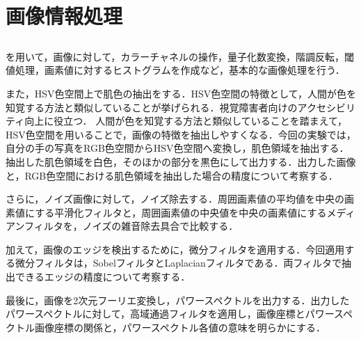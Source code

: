 \chapter{画像情報処理}
\section{\purpose}
\matlab を用いて，画像に対して，カラーチャネルの操作，量子化数変換，階調反転，閾値処理，画素値に対するヒストグラムを作成など，基本的な画像処理を行う．\par
また，HSV色空間上で肌色の抽出をする．HSV色空間の特徴として，人間が色を知覚する方法と類似していることが挙げられる．視覚障害者向けのアクセシビリティ向上に役立つ\cite[p.97\ -\ p.98]{画像処理}．
人間が色を知覚する方法と類似していることを踏まえて，HSV色空間を用いることで，画像の特徴を抽出しやすくなる．今回の実験では，自分の手の写真をRGB色空間からHSV色空間へ変換し，肌色領域を抽出する．抽出した肌色領域を白色，そのほかの部分を黒色にして出力する．出力した画像と，RGB色空間における肌色領域を抽出した場合の精度について考察する．\par
さらに，ノイズ画像に対して，ノイズ除去する．周囲画素値の平均値を中央の画素値にする平滑化フィルタと，周囲画素値の中央値を中央の画素値にするメディアンフィルタを，ノイズの雑音除去具合で比較する．\par
加えて，画像のエッジを検出するために，微分フィルタを適用する．今回適用する微分フィルタは，SobelフィルタとLaplacianフィルタである．両フィルタで抽出できるエッジの精度について考察する．\par
最後に，画像を2次元フーリエ変換し，パワースペクトルを出力する．出力したパワースペクトルに対して，高域通過フィルタを適用し，画像座標とパワースペクトル画像座標の関係と，パワースペクトル各値の意味を明らかにする．